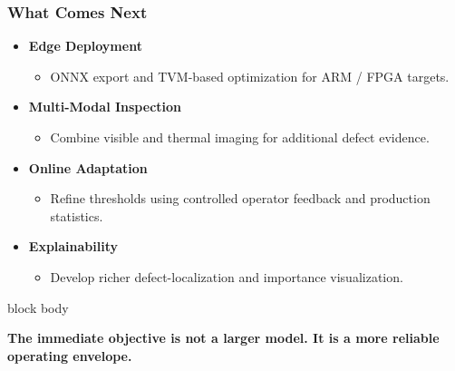 \documentclass[aspectratio=169,11pt]{beamer}
\newcommand{\emphred}[1]{\textcolor{secondary}{#1}}
\begin{document}
\begin{frame}\frametitle{\emphred{What Comes Next}}

\begin{itemize}

    \item
    \textbf{Edge Deployment}

    \begin{itemize}
        \item
        ONNX export and TVM-based optimization for
        ARM / FPGA targets.
    \end{itemize}

    \item
    \textbf{Multi-Modal Inspection}

    \begin{itemize}
        \item
        Combine visible and thermal imaging
        for additional defect evidence.
    \end{itemize}

    \item
    \textbf{Online Adaptation}

    \begin{itemize}
        \item
        Refine thresholds using controlled operator feedback
        and production statistics.
    \end{itemize}

    \item
    \textbf{Explainability}

    \begin{itemize}
        \item
        Develop richer defect-localization and
        importance visualization.
    \end{itemize}

\end{itemize}

\vspace{0.5cm}

\begin{beamercolorbox}[
    wd=0.9\paperwidth,
    rounded=true,
    sep=0.7em
  ]{block body}

\begin{center}

\textbf{
The immediate objective is not a larger model.
It is a more reliable operating envelope.
}

\end{center}

\end{beamercolorbox}

\end{frame}
\end{document}
